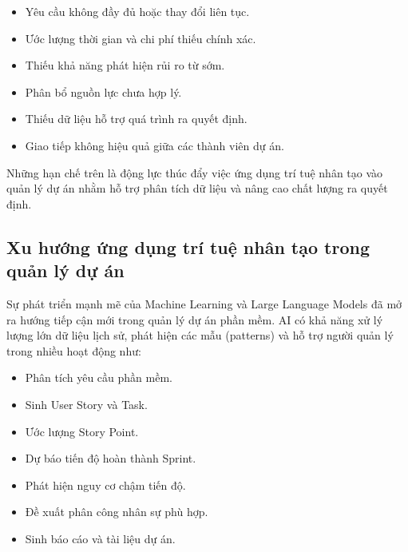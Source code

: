 \documentclass[12pt,a4paper]{report}
\begin{document}
\begin{itemize}

\item Yêu cầu không đầy đủ hoặc thay đổi liên tục.

\item Ước lượng thời gian và chi phí thiếu chính xác.

\item Thiếu khả năng phát hiện rủi ro từ sớm.

\item Phân bổ nguồn lực chưa hợp lý.

\item Thiếu dữ liệu hỗ trợ quá trình ra quyết định.

\item Giao tiếp không hiệu quả giữa các thành viên dự án.

\end{itemize}

Những hạn chế trên là động lực thúc đẩy việc ứng dụng trí tuệ nhân tạo vào quản lý dự án nhằm hỗ trợ phân tích dữ liệu và nâng cao chất lượng ra quyết định.

\subsection{Xu hướng ứng dụng trí tuệ nhân tạo trong quản lý dự án}
Sự phát triển mạnh mẽ của Machine Learning và Large Language Models đã mở ra hướng tiếp cận mới trong quản lý dự án phần mềm. AI có khả năng xử lý lượng lớn dữ liệu lịch sử, phát hiện các mẫu (patterns) và hỗ trợ người quản lý trong nhiều hoạt động như:

\begin{itemize}

\item Phân tích yêu cầu phần mềm.

\item Sinh User Story và Task.

\item Ước lượng Story Point.

\item Dự báo tiến độ hoàn thành Sprint.

\item Phát hiện nguy cơ chậm tiến độ.

\item Đề xuất phân công nhân sự phù hợp.

\item Sinh báo cáo và tài liệu dự án.

\end{itemize}
\end{document}
